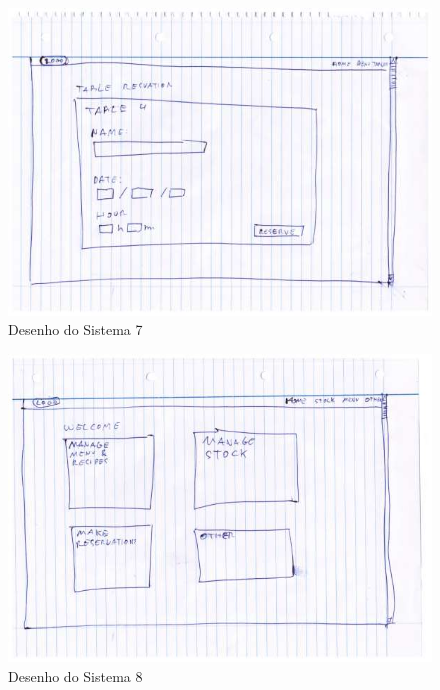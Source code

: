 \begin{figure}[!hbt]
    \centering
    \includegraphics[width=14cm]{Resources/Previous/image-096.jpg}
    \caption{Desenho do Sistema 7}
    
\end{figure}
\FloatBarrier
\begin{figure}[!hbt]
    \centering
    \includegraphics[width=14cm]{Resources/Previous/image-097.jpg}
    \caption{Desenho do Sistema 8}
    
\end{figure}
\FloatBarrier
